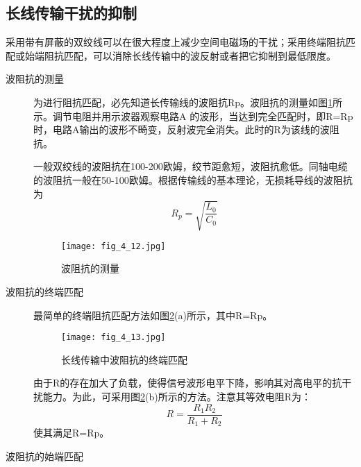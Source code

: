 \subsection{长线传输干扰的抑制}


采用带有屏蔽的双绞线可以在很大程度上减少空间电磁场的干扰；采用终端阻抗匹配或始端阻抗匹配，可以消除长线传输中的波反射或者把它抑制到最低限度。

\begin{description}
  \item[波阻抗的测量] 为进行阻抗匹配，必先知道长传输线的波阻抗Rp。波阻抗的测量如图\ref{fig_4_12}所示。调节电阻并用示波器观察电路A 的波形，当达到完全匹配时，即R=Rp 时，电路A输出的波形不畸变，反射波完全消失。此时的R为该线的波阻抗。

\begin{remark}
  一般双绞线的波阻抗在100-200欧姆，绞节距愈短，波阻抗愈低。同轴电缆的波阻抗一般在50-100欧姆。根据传输线的基本理论，无损耗导线的波阻抗为
  \begin{equation}
    R_p=\sqrt{\frac{L_0}{C_0}}
  \end{equation}
\end{remark}

\begin{figure}[h]
  \centering
  \texttt{[image: fig\_4\_12.jpg]}\\
  \caption{波阻抗的测量}\label{fig_4_12}
\end{figure}
  \item[波阻抗的终端匹配]
  最简单的终端阻抗匹配方法如图\ref{fig_4_13}(a)所示，其中R=Rp。

\begin{figure}[h]
  \centering
  \texttt{[image: fig\_4\_13.jpg]}\\
  \caption{长线传输中波阻抗的终端匹配}\label{fig_4_13}
\end{figure}

  \begin{remark}

由于R的存在加大了负载，使得信号波形电平下降，影响其对高电平的抗干扰能力。为此，可采用图\ref{fig_4_13}(b)所示的方法。注意其等效电阻R为：
\begin{equation}
  R=\frac{R_1R_2}{R_1+R_2}
\end{equation}
使其满足R=Rp。
  \end{remark}

  \item[波阻抗的始端匹配]


\end{description}
